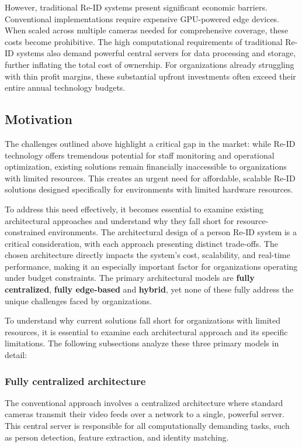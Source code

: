 \documentclass[../main.tex]{subfiles}
\begin{document}
However, traditional Re-ID systems present significant economic barriers. Conventional implementations require expensive GPU-powered edge devices. When scaled across multiple cameras needed for comprehensive coverage, these costs become prohibitive. The high computational requirements of traditional Re-ID systems also demand powerful central servers for data processing and storage, further inflating the total cost of ownership. For organizations already struggling with thin profit margins, these substantial upfront investments often exceed their entire annual technology budgets.

\subsection{Motivation}
\label{sec:motivation}

The challenges outlined above highlight a critical gap in the market: while Re-ID technology offers tremendous potential for staff monitoring and operational optimization, existing solutions remain financially inaccessible to organizations with limited resources. This creates an urgent need for affordable, scalable Re-ID solutions designed specifically for environments with limited hardware resources.

To address this need effectively, it becomes essential to examine existing architectural approaches and understand why they fall short for resource-constrained environments. The architectural design of a person Re-ID system is a critical consideration, with each approach presenting distinct trade-offs. The chosen architecture directly impacts the system's cost, scalability, and real-time performance, making it an especially important factor for organizations operating under budget constraints. The primary architectural models are \textbf{fully centralized}, \textbf{fully edge-based} and \textbf{hybrid}, yet none of these fully address the unique challenges faced by organizations.

To understand why current solutions fall short for organizations with limited resources, it is essential to examine each architectural approach and its specific limitations. The following subsections analyze these three primary models in detail:

\subsubsection{Fully centralized architecture}
The conventional approach involves a centralized architecture where standard cameras transmit their video feeds over a network to a single, powerful server. This central server is responsible for all computationally demanding tasks, such as person detection, feature extraction, and identity matching.
\end{document}
